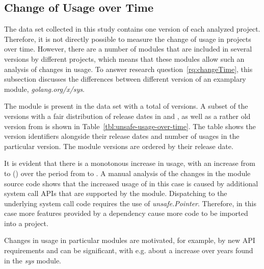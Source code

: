 
\subsection{Change of Usage over Time}\label{subsec:go-geiger:evaluation:over-time}

The data set collected in this study contains one version of each analyzed project.
Therefore, it is not directly possible to measure the change of \unsafe{} usage in projects over time.
However, there are a number of modules that are included in several versions by different projects, which means that
these modules allow such an analysis of changes in \unsafe{} usage.
To answer research question~\ref{rq:changeTime}, this subsection discusses the differences between different version of
an examplary module, \textit{golang.org/x/sys}.

The module is present in the data set with a total of \sysModuleVersions{} versions.
A subset of the versions with a fair distribution of release dates in  and , as well as a
rather old version from  is shown in Table~\ref{tbl:unsafe-usage-over-time}.
The table shows the version identifiers alongside their release dates and number of \unsafe{} usages in the particular
version.
The module versions are ordered by their release date.



It is evident that there is a monotonous increase in \unsafe{} usage, with an increase from \sysModuleLeastUnsafe{} to
\sysModuleMostUnsafe{} (\sysModuleUnsafeIncrease) over the  period from  to
.
A manual analysis of the changes in the module source code shows that the increased usage of \unsafe{} in this case is
caused by additional system call \acrshort{API}s that are supported by the module.
Dispatching to the underlying system call code requires the use of \textit{unsafe.Pointer}.
Therefore, in this case more features provided by a dependency cause more \unsafe{} code to be imported into a project.

\begin{answerToRQ}[\ref{rq:changeTime}]
    Changes in \unsafe{} usage in particular modules are motivated, for example, by new \acrshort{API} requirements and
    can be significant, with e.g. about a \sysModuleUnsafeIncreaseRounded{} increase over  years found in
    the \textit{sys} module.
\end{answerToRQ}


